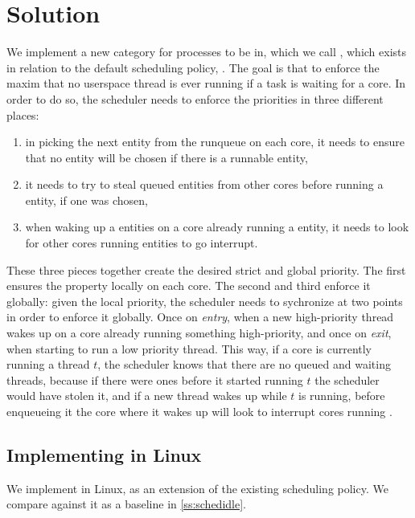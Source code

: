 \section{Solution}\label{s:maybe-solution}

We implement a new category for processes to be in, which we call \schedbe{},
which exists in relation to the default scheduling policy, \schednormal{}. The
goal is that to enforce the maxim that no \schedbe{} userspace thread is ever
running if a \schednormal{} task is waiting for a core. In order to do so, the
scheduler needs to enforce the priorities in three different places:
\begin{enumerate}
    \item in picking the next entity from the runqueue on each core, it needs to
ensure that no \schedbe{} entity will be chosen if there is a runnable
\schednormal{} entity,
    \item it needs to try to steal queued \schednormal{} entities from other cores
before running a \schedbe{} entity, if one was chosen,
    \item when waking up a \schednormal{} entities on a core already running a
    \schednormal{} entity, it needs to look for other cores running \schedbe{}
    entities to go interrupt.
\end{enumerate}

These three pieces together create the desired strict and global priority. The
first ensures the property locally on each core. The second and third enforce it
globally: given the local priority, the scheduler needs to sychronize at two
points in order to enforce it globally. Once on \textit{entry}, when a new
high-priority thread wakes up on a core already running something high-priority,
and once on \textit{exit}, when starting to run a low priority thread. This way,
if a core is currently running a \schedbe{} thread $t$, the scheduler knows that
there are no queued and waiting \schednormal{} threads, because if there were
ones before it started running $t$ the scheduler would have stolen it, and if a
new \schednormal{} thread wakes up while $t$ is running, before enqueueing it
the core where it wakes up will look to interrupt cores running \schedbe{}.


\subsection{Implementing \schedbe{} in Linux}

We implement \schedbe{} in Linux, as an extension of the existing \schedidle{}
scheduling policy. We compare against it as a baseline in
\autoref{ss:schedidle}. 

